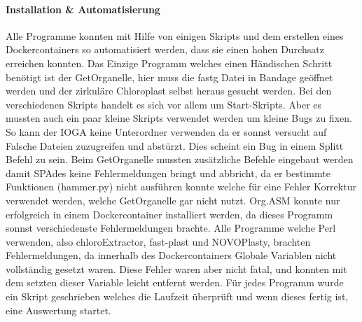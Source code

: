 \documentclass{scrartcl}
\begin{document}
\paragraph{Installation \& Automatisierung}
\label{sec-3-1-2-1}
Alle Programme konnten mit Hilfe von einigen Skripts und dem erstellen eines Dockercontainers so 
automatisiert werden, dass sie einen hohen Durchsatz erreichen konnten. Das Einzige Programm welches
einen Händischen Schritt benötigt ist der GetOrganelle, hier muss die fastg Datei in Bandage
geöffnet werden und der zirkuläre Chloroplast selbst heraus gesucht werden.
Bei den verschiedenen Skripts handelt es sich vor allem um Start-Skripts. Aber es mussten auch ein paar 
kleine Skripts verwendet werden um kleine Bugs zu fixen. So kann der IOGA keine Unterordner verwenden da er sonnst
versucht auf Falsche Dateien zuzugreifen und abstürzt. Dies scheint ein Bug in einem Splitt Befehl zu sein. Beim GetOrganelle mussten
zusätzliche Befehle eingebaut werden damit SPAdes keine Fehlermeldungen bringt und abbricht, da er bestimmte Funktionen (hammer.py) nicht ausführen konnte
welche für eine Fehler Korrektur verwendet werden, welche GetOrganelle gar nicht nutzt. Org.ASM konnte nur erfolgreich in einem Dockercontainer
installiert werden, da dieses Programm sonnst verschiedenste Fehlermeldungen brachte. Alle Programme welche Perl verwenden, also
chloroExtractor, fast-plast und NOVOPlasty, brachten Fehlermeldungen, da innerhalb des Dockercontainers Globale Variablen nicht vollständig gesetzt waren. 
Diese Fehler waren aber nicht fatal, und konnten mit dem setzten dieser Variable leicht entfernt werden. 
Für jedes Programm wurde ein Skript geschrieben welches die Laufzeit überprüft und wenn dieses fertig ist, eine Auswertung startet.
\end{document}
